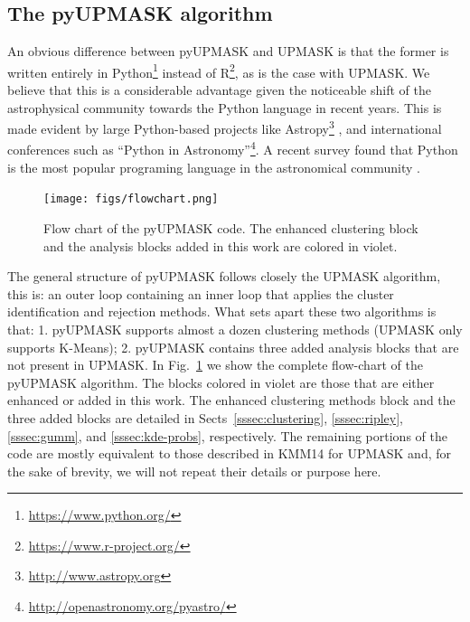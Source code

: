 \documentclass{aa}
\begin{document}
\subsection{The pyUPMASK algorithm}
 \label{ssec:pyupmask}

  An obvious difference between pyUPMASK and UPMASK is that the former is
  written entirely in Python\footnote{\url{https://www.python.org/}} instead
  of R\footnote{\url{https://www.r-project.org/}}, as is the case with UPMASK.
  We believe that this is a considerable advantage given the noticeable shift
  of the astrophysical community towards the Python language in recent years.
  This is made evident by large Python-based projects like
  Astropy\footnote{\url{http://www.astropy.org}} \citep{astropy:2013,
  astropy:2018},
  and international conferences such as ``Python in
  Astronomy''\footnote{\url{http://openastronomy.org/pyastro/}}. A recent
  survey found that Python is the most popular programing language in the
  astronomical community \citep{Momcheva2015,Tollerud2019SustainingCS}.

  \begin{figure}
   \centering
   \texttt{[image: figs/flowchart.png]}
   \caption{Flow chart of the pyUPMASK code. The enhanced clustering block and
   the analysis blocks added in this work are colored in violet.}
   \label{fig:flowchart}
  \end{figure}

  The general structure of pyUPMASK follows closely the UPMASK algorithm, this
  is: an outer loop containing an inner loop that applies the cluster
  identification and rejection methods. What sets apart these two algorithms
  is that: 1. pyUPMASK supports almost a dozen clustering
  methods (UPMASK only supports K-Means); 2. pyUPMASK contains
  three added analysis blocks that are not present in UPMASK.
  In Fig.~\ref{fig:flowchart} we show the complete flow-chart of the pyUPMASK
  algorithm. The blocks colored in violet are those that are either enhanced or
  added in this work.
  The enhanced clustering methods block and the three added blocks are detailed
  in Sects~\ref{sssec:clustering}, \ref{sssec:ripley},
  \ref{sssec:gumm}, and \ref{sssec:kde-probs}, respectively. The remaining
  portions of the code are mostly equivalent to those described in KMM14 for
  UPMASK and, for the sake of brevity, we will not repeat their details or
  purpose here.
\end{document}
